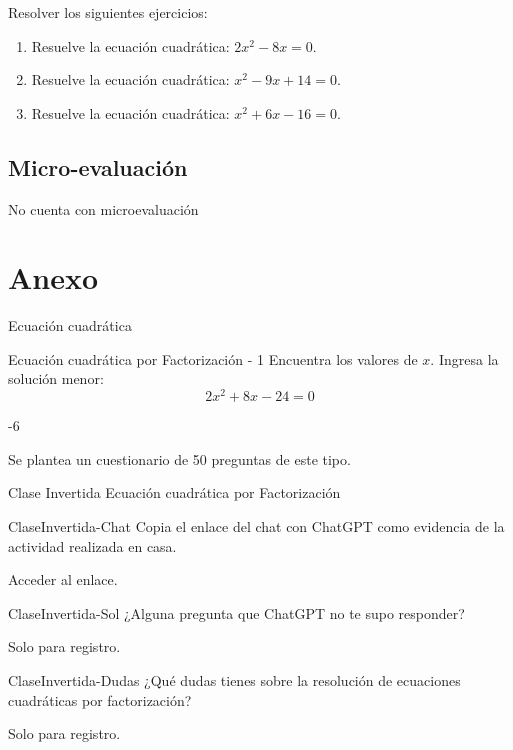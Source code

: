 \documentclass[a4,11pt]{aleph-notas}
\begin{document}
Resolver los siguientes ejercicios:

\begin{enumerate}
    \item Resuelve la ecuación cuadrática: $2x^2 - 8x = 0$.
    \item Resuelve la ecuación cuadrática: $x^2 - 9x + 14 = 0$.
    \item Resuelve la ecuación cuadrática: $x^2 + 6x - 16 = 0$.
\end{enumerate}

\subsection{Micro-evaluación}

No cuenta con microevaluación

\section{Anexo}

\begin{quiz}{Ecuación cuadrática}

\begin{numerical}[]%
    {Ecuación cuadrática por Factorización - 1}
    Encuentra los valores de $x$. Ingresa la solución menor:
    \[
        2 x^{2} + 8 x - 24 = 0
    \]
    \item[] -6
\end{numerical}

\end{quiz}

Se plantea un cuestionario de 50 preguntas de este tipo.

\begin{quiz}{Clase Invertida Ecuación cuadrática por Factorización}
    
\begin{essay}[response format=text, response field lines=5]%
    {ClaseInvertida-Chat}
    Copia el enlace del chat con ChatGPT como evidencia de la actividad realizada en casa.
    \item Acceder al enlace.
\end{essay}

\begin{essay}[response format=text, response field lines=5]%
    {ClaseInvertida-Sol}
    ¿Alguna pregunta que ChatGPT no te supo responder?
    \item Solo para registro.
\end{essay}

\begin{essay}[response format=text, response field lines=5]%
    {ClaseInvertida-Dudas}
    ¿Qué dudas tienes sobre la resolución de ecuaciones cuadráticas por factorización?
    \item Solo para registro.
\end{essay}



\end{quiz}
\end{document}

